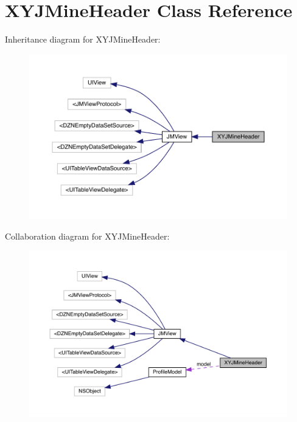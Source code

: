 \hypertarget{interface_x_y_j_mine_header}{}\section{X\+Y\+J\+Mine\+Header Class Reference}
\label{interface_x_y_j_mine_header}


Inheritance diagram for X\+Y\+J\+Mine\+Header\+:\nopagebreak
\begin{figure}[H]
\begin{center}
\leavevmode
\includegraphics[width=350pt]{interface_x_y_j_mine_header__inherit__graph}
\end{center}
\end{figure}


Collaboration diagram for X\+Y\+J\+Mine\+Header\+:\nopagebreak
\begin{figure}[H]
\begin{center}
\leavevmode
\includegraphics[width=350pt]{interface_x_y_j_mine_header__coll__graph}
\end{center}
\end{figure}
